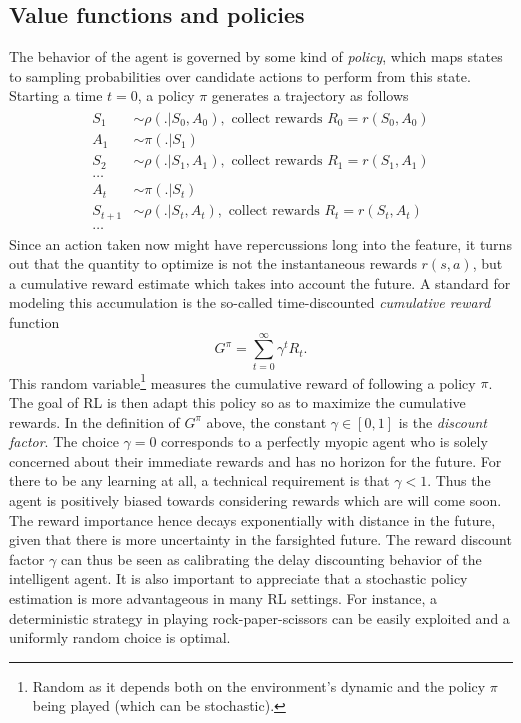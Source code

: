 \documentclass{article} %
\begin{document}
\subsection{Value functions and policies}
The behavior of the agent is governed by some kind of \textit{policy}, which maps states to
sampling probabilities over candidate actions to perform from this state. Starting a time $t=0$,
a policy $\pi$ generates a trajectory as follows
\begin{eqnarray*}
  \begin{split}
    S_1 &\sim \rho(.|S_0,A_0), \text{ collect rewards }R_0 = r(S_0, A_0)\\
    A_1 &\sim \pi(.|S_1)\\
    S_2 &\sim \rho(.|S_1,A_1), \text{ collect rewards }R_1 = r(S_1, A_1)\\
    \ldots\\
    A_{t} &\sim \pi(.|S_{t})\\
    S_{t+1} &\sim \rho(.|S_{t},A_{t}), \text{ collect rewards }R_{t} = r(S_{t}, A_{t})\\
    \ldots
  \end{split}
\end{eqnarray*}
Since an action taken now might have repercussions long into the feature, it turns out that the
quantity to optimize is not the instantaneous rewards $r(s, a)$, but a
cumulative reward estimate which takes into account the future. A standard for
modeling this accumulation is the so-called
time-discounted \textit{cumulative reward} function
\begin{equation}
  \label{eq:cumr}
  G^\pi = \sum_{t=0}^{\infty}\gamma^{t}R_t.
\end{equation}
This random variable\footnote{Random as it depends both on the environment's dynamic and the
  policy $\pi$ being played (which can be stochastic).}  measures the cumulative reward of
following a
policy $\pi$. The  goal of RL is then adapt this policy so as to  maximize the cumulative rewards.
In the definition of $G^\pi$ above, the constant $\gamma \in [0, 1]$ is the \textit{discount factor}. The choice $\gamma = 0$   corresponds to a perfectly myopic agent who is solely concerned about their immediate rewards and has no horizon
for the future. For there to be any learning at all, a technical requirement is that $\gamma < 1$.
Thus the agent is positively biased towards considering rewards which are will
come soon. The reward importance hence decays exponentially
with distance in the future,
given that there is more uncertainty in the farsighted future.
The reward discount factor $\gamma$ can thus be seen as calibrating
the delay discounting behavior of the intelligent agent.
It is also important to appreciate that a stochastic policy estimation
is more advantageous in many RL settings.
For instance, a deterministic strategy in playing rock-paper-scissors can
be easily exploited and a uniformly random choice is optimal.
\end{document}
